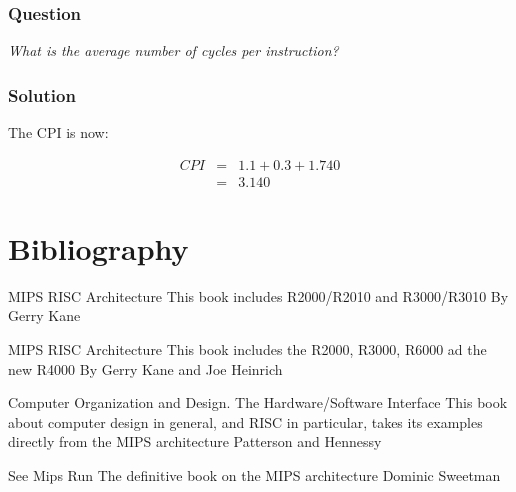 
\begin{frame}
  \frametitle{Question}

  \textit{What is the average number of cycles per instruction?}
\end{frame}


\begin{frame}
  \frametitle{Solution}

  The CPI is now:

  \-

  \begin{eqnarray*}
    CPI & = & 1.1 + 0.3 + 1.740 \\
        & = & 3.140
  \end{eqnarray*}
\end{frame}

%
%

\section{Bibliography}

\begin{thebibliography}{4}

    MIPS RISC Architecture
    \newblock This book includes R2000/R2010 and R3000/R3010
    \newblock By Gerry Kane

    MIPS RISC Architecture
    \newblock This book includes the R2000, R3000, R6000 ad the new R4000
    \newblock By Gerry Kane and Joe Heinrich

    Computer Organization and Design. The Hardware/Software Interface
    \newblock This book about computer design in general, and RISC
    in particular, takes its examples directly from the MIPS architecture
    \newblock Patterson and Hennessy

    See Mips Run
    \newblock The definitive book on the MIPS architecture
    \newblock Dominic Sweetman

\end{thebibliography}


